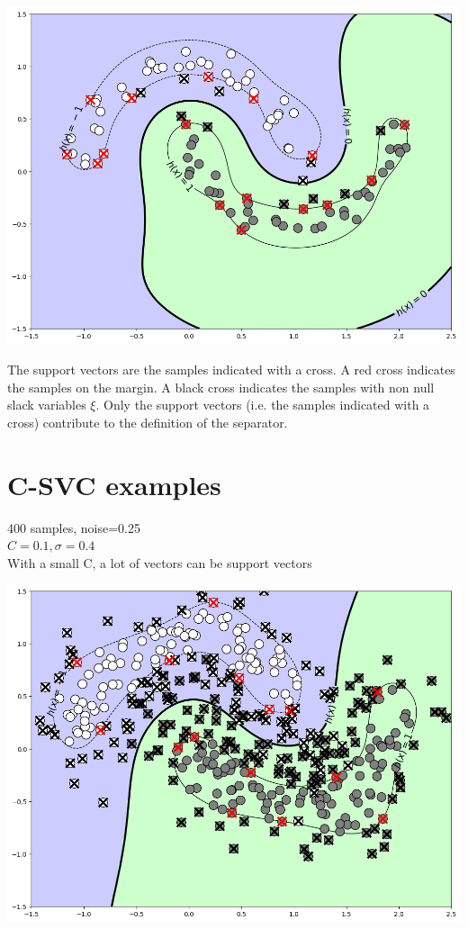\documentclass{article}
\begin{document}
\begin{multicols*}{3}
				\includegraphics[width=\columnwidth]{csvc001.png}

The support vectors are the samples indicated with a cross. A red cross indicates the samples on the margin. A black cross indicates the samples with non null slack variables $\xi$. Only the support vectors (i.e. the samples indicated with a cross) contribute to the definition of the separator.
			
\section*{C-SVC examples}

\begin{minipage}{0.5\columnwidth}
	400 samples, noise=0.25\\
	$C=0.1 ,\sigma=0.4$\\
	With a small C, a lot of vectors can be support vectors
	\columnbreak
\end{minipage}
\begin{minipage}{0.4\columnwidth}
	\includegraphics[width=\columnwidth]{csvc003.png}
\end{minipage}


\end{multicols*}
\end{document}
